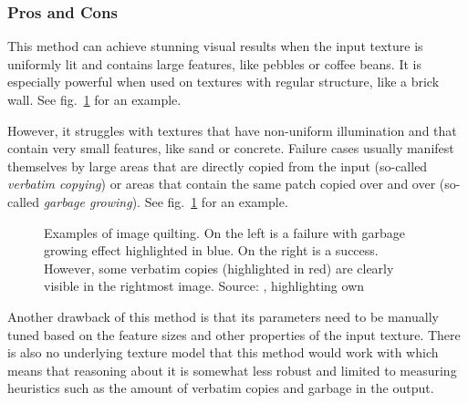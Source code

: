 \subsubsection{Pros and Cons}
\label{section:background-texture_synthesis-patch_based-pros_and_cons}

This method can achieve stunning visual results when the input texture is uniformly lit and contains large features, like pebbles or coffee beans. It is especially powerful when used on textures with regular structure, like a brick wall. See fig.~\ref{fig:background_quilting_pros_cons} for an example.

However, it struggles with textures that have non-uniform illumination and that contain very small features, like sand or concrete. Failure cases usually manifest themselves by large areas that are directly copied from the input (so-called \textit{verbatim copying}) or areas that contain the same patch copied over and over (so-called \textit{garbage growing}). See fig.~\ref{fig:background_quilting_pros_cons} for an example.

\begin{figure}
    \centering
    \caption{Examples of image quilting. On the left is a failure with garbage growing effect highlighted in blue. On the right is a success. However, some verbatim copies (highlighted in red) are clearly visible in the rightmost image. Source: \citet{Raad2018}, highlighting own}
    \label{fig:background_quilting_pros_cons}
\end{figure}

Another drawback of this method is that its parameters need to be manually tuned based on the feature sizes and other properties of the input texture. There is also no underlying texture model that this method would work with which means that reasoning about it is somewhat less robust and limited to measuring heuristics such as the amount of verbatim copies and garbage in the output.

